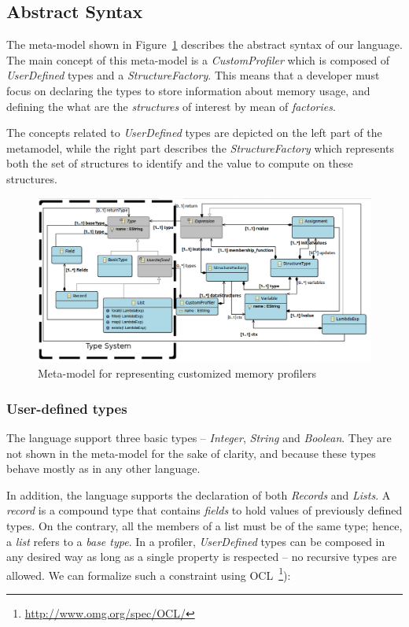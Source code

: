 \subsection{Abstract Syntax}\label{sec:abstract-syntax}

The meta-model shown in Figure~\ref{fig:as} describes the abstract syntax of our language.
The main concept of this meta-model is a \textit{CustomProfiler} which is composed of \textit{UserDefined} types and a \textit{StructureFactory}.
This means that a developer must focus on declaring the types to store information about memory usage, and defining the what are the \textit{structures} of interest by mean of \textit{factories}.

The concepts related to \textit{UserDefined} types are depicted on the left part of the metamodel, while the right part describes the \textit{StructureFactory} which represents both the set of  structures to identify and the value to compute on these structures.

\begin{figure}
\centering
\includegraphics[width=0.93\linewidth]{chapter6/fig/AS}
\caption{Meta-model for representing customized memory profilers}
\label{fig:as}
\end{figure}

\subsubsection*{User-defined types}
The language support three basic types -- \textit{Integer}, \textit{String} and \textit{Boolean}.
They are not shown in the meta-model for the sake of clarity, and because these types behave mostly as in any other language.

In addition, the language supports the declaration of both \textit{Records} and \textit{Lists}.
A \textit{record} is a compound type that contains \textit{fields} to hold values of previously defined types.
On the contrary,  all the members of a list must be of the same type; hence, a \textit{list} refers to a \textit{base type}.
In a profiler, \textit{UserDefined} types can be composed in any desired way as long as a single property is respected -- no recursive types are allowed.
We can formalize such a constraint using \gls{OCL}~\footnote{\url{http://www.omg.org/spec/OCL/}}):

